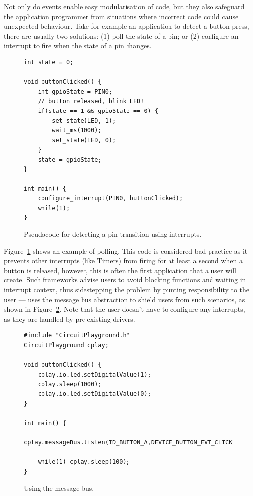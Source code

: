 Not only do events enable easy modularisation of code, but they also safeguard the application programmer from situations where incorrect code could cause unexpected behaviour. Take for example an application to detect a button press, there are usually two solutions: (1) poll the state of a pin; or (2) configure an interrupt to fire when the state of a pin changes.

\begin{figure}
\begin{lstlisting}
int state = 0;

void buttonClicked() {
    int gpioState = PIN0;
    // button released, blink LED!
    if(state == 1 && gpioState == 0) {
        set_state(LED, 1);
        wait_ms(1000);
        set_state(LED, 0);
    }
    state = gpioState;
}

int main() {
    configure_interrupt(PIN0, buttonClicked);
    while(1);
}
\end{lstlisting}
\caption{\label{fig:pollPin}Pseudocode for detecting a pin transition using interrupts.}
\end{figure}

Figure~\ref{fig:pollPin} shows an example of polling.
This code is considered bad practice as it prevents other interrupts (like Timers) from firing for at least a second when a button is released, however, this is often the first application that a user will create. Such frameworks advise users to avoid blocking functions and waiting in interrupt context, thus sidestepping the problem by punting responsibility to the user --- \CO uses the message bus abstraction to shield users from such scenarios, as shown in Figure~\ref{fig:messageBus}. Note that the user doesn't have to configure any interrupts, as they are handled by pre-existing drivers.

\begin{figure}
\begin{lstlisting}
#include "CircuitPlayground.h"
CircuitPlayground cplay;

void buttonClicked() {
    cplay.io.led.setDigitalValue(1);
    cplay.sleep(1000);
    cplay.io.led.setDigitalValue(0);
}

int main() {
    cplay.messageBus.listen(ID_BUTTON_A,DEVICE_BUTTON_EVT_CLICK,buttonClicked);

    while(1) cplay.sleep(100);
}
\end{lstlisting}
\caption{\label{fig:messageBus}Using the message bus.}
\end{figure}

